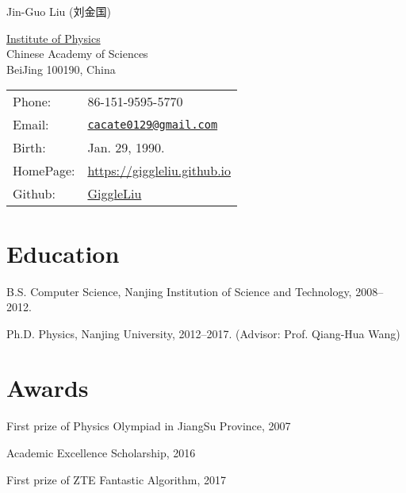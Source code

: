 \documentclass[letterpaper]{article}
\def\name{Jin-Guo Liu (刘金国)}
\renewenvironment{itemize}{
  \begin{list}{}{
    \setlength{\leftmargin}{1.5em}
  }
}{
  \end{list}
}
\begin{document}
{\huge \name}


\vspace{0.2in}

\begin{minipage}{0.45\linewidth}
    \href{http://english.iop.cas.cn/}{Institute of Physics}\\
    Chinese Academy of Sciences\\
    BeiJing 100190, China
\end{minipage}
\begin{minipage}{0.45\linewidth}
    \begin{tabular}{ll}
        Phone: & 86-151-9595-5770 \\
        Email: & \href{mailto:cacate0129@gmail.com}{\tt cacate0129@gmail.com} \\
        Birth: & Jan. 29, 1990.\\
        HomePage: & \href{https://giggleliu.github.io}{https://giggleliu.github.io}\\
        Github: & \href{https://github.com/GiggleLiu}{GiggleLiu}
    \end{tabular}
\end{minipage}



\section*{Education}

\begin{itemize}
    \item B.S. Computer Science, Nanjing Institution of Science and Technology, 2008--2012.
    \item Ph.D. Physics, Nanjing University, 2012--2017. (Advisor: Prof. Qiang-Hua Wang)
\end{itemize}

\section*{Awards}
\begin{itemize}
    \item First prize of Physics Olympiad in JiangSu Province, 2007
    \item Academic Excellence Scholarship, 2016
    \item First prize of ZTE Fantastic Algorithm, 2017
\end{itemize}
\end{document}
